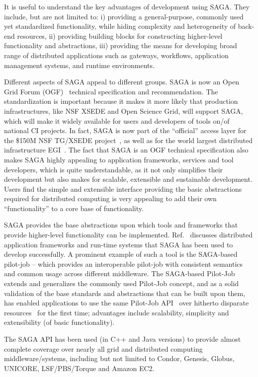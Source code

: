 \documentclass[]{article}
\begin{document}
It is useful to understand the key advantages of development using
SAGA. They include, but are not limited to: i) providing a
general-purpose, commonly used yet standardized functionality, while
hiding complexity and heterogeneity of back-end resources, ii)
providing building blocks for constructing higher-level functionality
and abstractions, iii) providing the means for developing broad range
of distributed applications such as gateways, workﬂows, application
management systems, and runtime environments.

Different aspects of SAGA appeal to different groups. SAGA is now an
Open Grid Forum (OGF)~\cite{ogf-url} technical specification and
recommendation. The standardization is important because it makes it
more likely that production infrastructures, like NSF XSEDE and Open
Science Grid, will support SAGA, which will make it widely available
for users and developers of tools on/of national CI projects. In fact,
SAGA is now part of the “oﬃcial” access layer for the \$150M NSF
TG/XSEDE project~\cite{xsede}, as well as for the world largest
distributed infrastructure EGI~\cite{egi}. The fact that SAGA is an
OGF technical speciﬁcation also makes SAGA highly appealing to
application frameworks, services and tool developers, which is quite
understandable, as it not only simpliﬁes their development but also
makes for scalable, extensible and sustainable development. Users ﬁnd
the simple and extensible interface providing the basic abstractions
required for distributed computing is very appealing to add their own
“functionality” to a core base of functionality.

SAGA provides the base abstractions upon which tools and frameworks
that provide higher-level functionality can be
implemented. Ref.~\cite{saga-url} discusses distributed application
frameworks and run-time systems that SAGA has been used to develop
successfully. A prominent example of such a tool is the SAGA-based
pilot-job – which provides an interoperable pilot-job with consistent
semantics and common usage across different middleware. The SAGA-based
Pilot-Job extends and generalizes the commonly used Pilot-Job concept,
and as a solid validation of the base standards and abstractions that
can be built upon them, has enabled applications to use the same
Pilot-Job API~\cite{} over hitherto disparate resources~\cite{} for
the ﬁrst time; advantages include scalability, simplicity and
extensibility (of basic functionality).

The SAGA API has been used (in C++ and Java versions) to provide
almost complete coverage over nearly all grid and distributed
computing middleware/systems, including but not limited to Condor,
Genesis, Globus, UNICORE, LSF/PBS/Torque and Amazon EC2.
\end{document}
